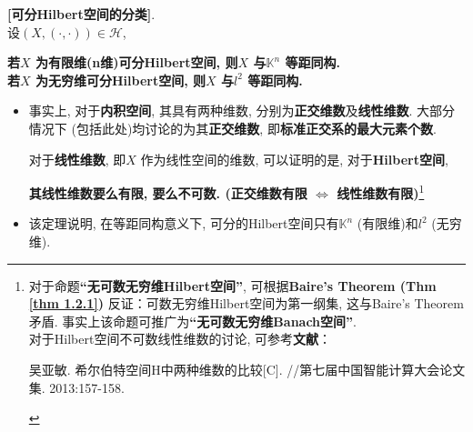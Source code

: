 	\begin{thm}\label{thm 3.4.3}
		\textbf{[可分Hilbert空间的分类]}. \\
		设$(X , (\cdot , \cdot)) \in \mathcal{H}$, 
		\begin{center}
			\textbf{若$X$ 为有限维(n维)可分Hilbert空间, 则$X$ 与$\mathbb{K}^n$ 等距同构. \\
				若$X$ 为无穷维可分Hilbert空间, 则$X$ 与$l^2$ 等距同构. }
		\end{center}
	
		\vspace{4em}
		
		\begin{rmk}
			\begin{itemize}
				\item 事实上, 对于\textbf{内积空间}, 其具有两种维数, 分别为\textbf{正交维数}及\textbf{线性维数}. 大部分情况下 (包括此处)均讨论的为其\textbf{正交维数}, 即\textbf{标准正交系的最大元素个数}. 
				
				\newpage
				
				对于\textbf{线性维数}, 即$X$ 作为线性空间的维数, 可以证明的是, 对于\textbf{Hilbert空间}, 
				\begin{center}
					\textbf{其线性维数要么有限, 要么不可数. (正交维数有限 $\Leftrightarrow$ 线性维数有限)}\footnote{对于命题\textbf{“无可数无穷维Hilbert空间”}, 可根据\textbf{Baire's Theorem (Thm \ref{thm 1.2.1})} 反证：可数无穷维Hilbert空间为第一纲集, 这与Baire's Theorem 矛盾. 事实上该命题可推广为\textbf{“无可数无穷维Banach空间”}. \\
					对于Hilbert空间不可数线性维数的讨论, 可参考\textbf{文献}：
					\begin{center}
						吴亚敏. 希尔伯特空间H中两种维数的比较[C]. //第七届中国智能计算大会论文集. 2013:157-158.
					\end{center}
					}
				\end{center}
				
				\vspace{2em}
				
				\item 该定理说明, 在等距同构意义下, 可分的Hilbert空间只有$\mathbb{K}^n$ (有限维)和$l^2$ (无穷维).
			\end{itemize}
			
		\end{rmk}
	
		\vspace{4em}
		

\end{thm}
